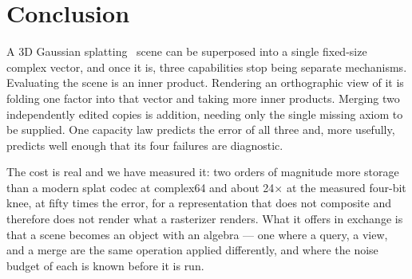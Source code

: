 \documentclass[11pt]{article}
\begin{document}
\section{Conclusion}

A 3D Gaussian splatting~\cite{kerbl20233dgs} scene can be superposed
into a single fixed-size complex vector, and once it is, three
capabilities stop being separate mechanisms. Evaluating the scene is an
inner product. Rendering an orthographic view of it is folding one
factor into that vector and taking more inner products. Merging two
independently edited copies is addition, needing only the single missing
axiom to be supplied. One capacity law predicts the error of all three
and, more usefully, predicts well enough that its four failures are
diagnostic.

The cost is real and we have measured it: two orders of magnitude more
storage than a modern splat codec at complex64 and about 24$\times$ at
the measured four-bit knee, at fifty times the error, for a
representation that does not composite and therefore does not render
what a rasterizer renders. What it offers in exchange is that a scene
becomes an object with an algebra --- one where a query, a view, and a
merge are the same operation applied differently, and where the noise
budget of each is known before it is run.
\end{document}
